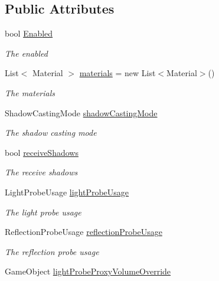 \subsection*{Public Attributes}
\begin{DoxyCompactItemize}
\item 
bool \hyperlink{class_serialize_renderer_1_1_stored_information_a2e6df1181c4de87282435a6aba765661}{Enabled}
\begin{DoxyCompactList}\small\item\em The enabled \end{DoxyCompactList}\item 
List$<$ Material $>$ \hyperlink{class_serialize_renderer_1_1_stored_information_af5b365bc566d25c57705f856acd1c661}{materials} = new List$<$Material$>$()
\begin{DoxyCompactList}\small\item\em The materials \end{DoxyCompactList}\item 
Shadow\+Casting\+Mode \hyperlink{class_serialize_renderer_1_1_stored_information_afbd4ac83383a2cf02b87098c6092e94b}{shadow\+Casting\+Mode}
\begin{DoxyCompactList}\small\item\em The shadow casting mode \end{DoxyCompactList}\item 
bool \hyperlink{class_serialize_renderer_1_1_stored_information_a5e2eaf240db0d8d59eaf20f15a2e0b67}{receive\+Shadows}
\begin{DoxyCompactList}\small\item\em The receive shadows \end{DoxyCompactList}\item 
Light\+Probe\+Usage \hyperlink{class_serialize_renderer_1_1_stored_information_abcb52c7f8164fc1960646ec2d3c01e52}{light\+Probe\+Usage}
\begin{DoxyCompactList}\small\item\em The light probe usage \end{DoxyCompactList}\item 
Reflection\+Probe\+Usage \hyperlink{class_serialize_renderer_1_1_stored_information_afa342328b7555a7565d9eae3060dfcea}{reflection\+Probe\+Usage}
\begin{DoxyCompactList}\small\item\em The reflection probe usage \end{DoxyCompactList}\item 
Game\+Object \hyperlink{class_serialize_renderer_1_1_stored_information_aafe2ddaa55797c0a12c815107aa4401a}{light\+Probe\+Proxy\+Volume\+Override}

\end{DoxyCompactItemize}
